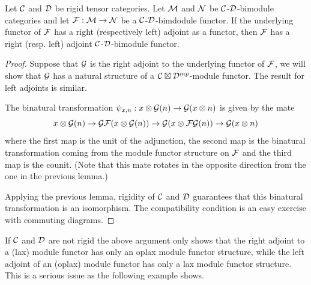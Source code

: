 \documentclass{amsart}
\begin{document}
\begin{lemma} \label{module-adjoint}
Let $\mathcal C$ and $\mathcal D$ be rigid tensor categories. Let  $\mathcal M$ and  $\mathcal N$  be  $\mathcal C$-$\mathcal D$-bimodule categories and let $\mathcal F: \mathcal M \to \mathcal N$ be a $\mathcal C$-$\mathcal D$-bimdodule functor.  If the underlying functor of $\mathcal F$ has a right (respectively left) adjoint as a functor, then $\mathcal F$ has a right (resp. left) adjoint $\mathcal C$-$\mathcal D$-bimodule functor. 
\end{lemma}
\begin{proof}
Suppose that $\mathcal G$ is the right adjoint to the underlying functor of $\mathcal F$, we will show that $\mathcal G$ has a natural structure of a $\mathcal C\boxtimes \mathcal D^{mp}$-module functor.  The result for left adjoints is similar.

The binatural transformation $\psi_{x,n}: x \otimes \mathcal G(n) \rightarrow \mathcal G(x \otimes n)$ is given by the mate
$$x \otimes \mathcal G(n) \rightarrow \mathcal G \mathcal F(x \otimes \mathcal G(n)) \rightarrow \mathcal G(x \otimes \mathcal F\mathcal G(n)) \rightarrow \mathcal G(x \otimes n)$$
where the first map is the unit of the adjunction, the second map is the binatural transformation coming from the module functor structure on $\mathcal F$ and the third map is the counit.  (Note that this mate rotates in the opposite direction from the one in the previous lemma.)


Applying the previous lemma, rigidity of $\mathcal C$ and $\mathcal D$ guarantees that this binatural transformation is an isomorphism.  The compatibility condition is an easy exercise with commuting diagrams.
\end{proof}

\begin{remark}
If $\mathcal C$ and $\mathcal D$ are not rigid the above argument only shows that the right adjoint to a (lax) module functor has only an oplax module functor structure, while the left adjoint of an (oplax) module functor has only a lax module functor structure.  This is a serious issue as the following example shows. 
\end{remark}
\end{document}
